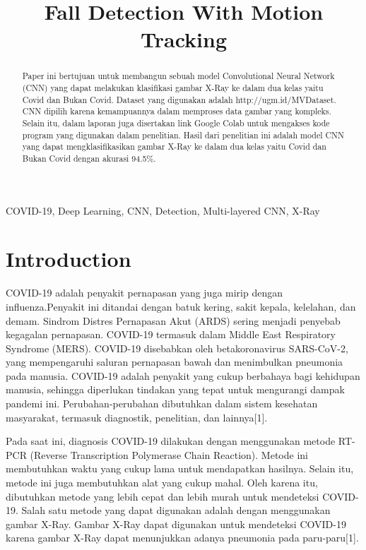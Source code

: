 \documentclass[conference]{IEEEtran}
\begin{document}
\title{Fall Detection With Motion Tracking
}

\author{
}

\maketitle

\begin{abstract}
    Paper ini bertujuan untuk membangun sebuah model Convolutional Neural Network (CNN) yang dapat melakukan klasifikasi gambar X-Ray ke dalam dua kelas yaitu Covid dan Bukan Covid. Dataset yang digunakan adalah http://ugm.id/MVDataset. CNN dipilih karena kemampuannya dalam memproses data gambar yang kompleks. Selain itu, dalam laporan juga disertakan link Google Colab untuk mengakses kode program yang digunakan dalam penelitian. Hasil dari penelitian ini adalah model CNN yang dapat mengklasifikasikan gambar X-Ray ke dalam dua kelas yaitu Covid dan Bukan Covid dengan akurasi 94.5\%.
\end{abstract}

\begin{IEEEkeywords}
COVID-19, Deep Learning, CNN, Detection, Multi-layered CNN, X-Ray
\end{IEEEkeywords}

\section{Introduction}
COVID-19 adalah penyakit pernapasan yang juga mirip dengan influenza.Penyakit ini ditandai dengan batuk kering, sakit kepala, kelelahan, dan demam. Sindrom Distres Pernapasan Akut (ARDS) sering menjadi penyebab kegagalan pernapasan. COVID-19 termasuk dalam Middle East Respiratory Syndrome (MERS). COVID-19 disebabkan oleh betakoronavirus SARS-CoV-2, yang mempengaruhi saluran pernapasan bawah dan menimbulkan pneumonia pada manusia. COVID-19 adalah penyakit yang cukup berbahaya bagi kehidupan manusia, sehingga diperlukan tindakan yang tepat untuk mengurangi dampak pandemi ini. Perubahan-perubahan dibutuhkan dalam sistem kesehatan masyarakat, termasuk diagnostik, penelitian, dan lainnya[1].

Pada saat ini, diagnosis COVID-19 dilakukan dengan menggunakan metode RT-PCR (Reverse Transcription Polymerase Chain Reaction). Metode ini membutuhkan waktu yang cukup lama untuk mendapatkan hasilnya. Selain itu, metode ini juga membutuhkan alat yang cukup mahal. Oleh karena itu, dibutuhkan metode yang lebih cepat dan lebih murah untuk mendeteksi COVID-19. Salah satu metode yang dapat digunakan adalah dengan menggunakan gambar X-Ray. Gambar X-Ray dapat digunakan untuk mendeteksi COVID-19 karena gambar X-Ray dapat menunjukkan adanya pneumonia pada paru-paru[1].
\end{document}
